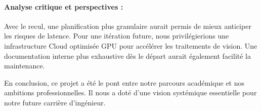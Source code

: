 \paragraph{Analyse critique et perspectives :}
Avec le recul, une planification plus granulaire aurait permis de mieux anticiper les risques de latence. Pour une itération future, nous privilégierions une infrastructure Cloud optimisée GPU pour accélérer les traitements de vision. Une documentation interne plus exhaustive dès le départ aurait également facilité la maintenance.

En conclusion, ce projet a été le pont entre notre parcours académique et nos ambitions professionnelles. Il nous a doté d'une vision systémique essentielle pour notre future carrière d'ingénieur.
